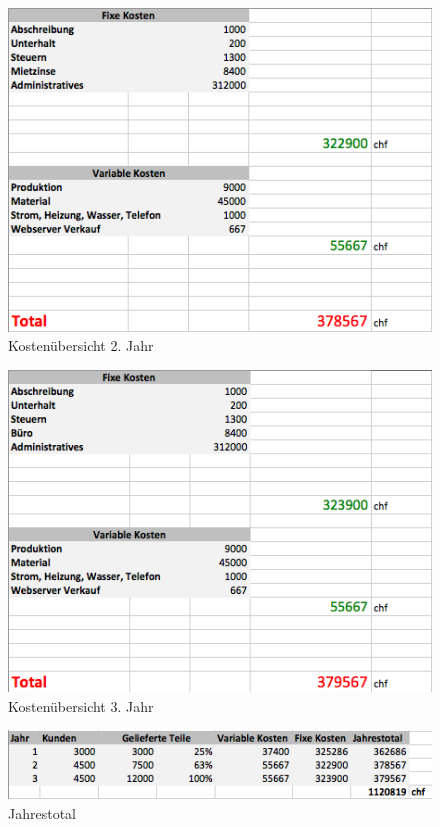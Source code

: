 \begin{figure}[H]
	\centering
		\includegraphics[scale=0.6]{bilder/Jahr2.png}
	\caption{Kosten\"ubersicht 2. Jahr}
	\label{fig:Jahr2}
\end{figure}
\begin{figure}[H]
	\centering
		\includegraphics[scale=0.6]{bilder/Jahr3.png}
	\caption{Kosten\"ubersicht 3. Jahr}
	\label{fig:Jahr3}
\end{figure}
\begin{figure}[H]
	\centering
		\includegraphics[scale=0.6]{bilder/kosten_ubersicht.png}
	\caption{Jahrestotal}
	\label{fig:Jahrestotal}
\end{figure}
